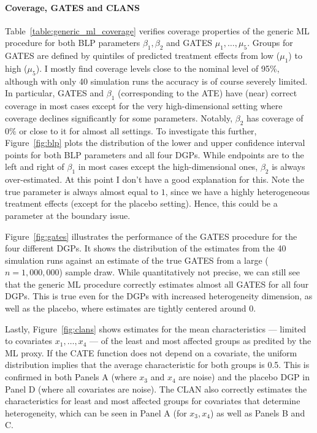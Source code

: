 \documentclass[11pt, a4paper, leqno]{article}
\begin{document}
\paragraph*{Coverage, GATES and CLANS}
Table~\ref*{table:generic_ml_coverage} verifies coverage properties of the generic ML procedure for both BLP parameters $\beta_1, \beta_2$ and GATES $\mu_1, \ldots, \mu_5$.
Groups for GATES are defined by quintiles of predicted treatment effects from low ($\mu_1$) to high ($\mu_5$).
I mostly find coverage levels close to the nominal level of 95\%, although with only 40 simulation runs the accuracy is of course severely limited.
In particular, GATES and $\beta_1$ (corresponding to the ATE) have (near) correct coverage in most cases except for the very high-dimensional setting where coverage declines significantly for some parameters. Notably, $\beta_2$ has coverage of $0\%$ or close to it for almost all settings.
To investigate this further, Figure~\ref*{fig:blp} plots the distribution of the lower and upper confidence interval points for both BLP parameters and all four DGPs.
While endpoints are to the left and right of $\beta_1$ in most cases except the high-dimensional ones, $\beta_2$ is always over-estimated.
At this point I don't have a good explanation for this. Note the true parameter is always almost equal to $1$, since we have a highly heterogeneous treatment effects (except for the placebo setting).
Hence, this could be a parameter at the boundary issue.

Figure~\ref*{fig:gates} illustrates the performance of the GATES procedure for the four different DGPs\@.
It shows the distribution of the estimates from the 40 simulation runs against an estimate of the true GATES from a large ($n=1,000,000$) sample draw.
While quantitatively not precise, we can still see that the generic ML procedure correctly estimates almost all GATES for all four DGPs.
This is true even for the DGPs with increased heterogeneity dimension, as well as the placebo, where estimates are tightly centered around 0.

Lastly, Figure~\ref*{fig:clans} shows estimates for the mean characteristics --- limited to covariates $x_1, \ldots, x_4$ --- of the least and most affected groups as predited by the ML proxy.
If the CATE function does not depend on a covariate, the uniform distribution implies that the average characteristic for both groups is 0.5.
This is confirmed in both Panels A (where $x_3$ and $x_4$ are noise) and the placebo DGP in Panel D (where all covariates are noise).
The CLAN also correctly estimates the characteristics for least and most affected groups for covariates that determine heterogeneity, which can be seen in Panel A (for $x_3, x_4$) as well as Panels B and C.
\end{document}
